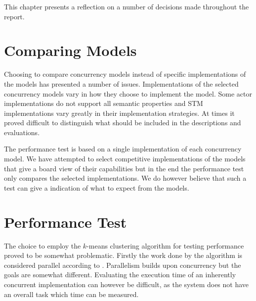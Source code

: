 \makeatletter {}\makeatother
{}
This chapter presents a reflection on a number of decisions made throughout the report.

\section{Comparing Models}
Choosing to compare concurrency models instead of specific implementations of the models has presented a number of issues. Implementations of the selected concurrency models vary in how they choose to implement the model. Some actor implementations do not support all semantic properties and \ac{STM} implementations vary greatly in their implementation strategies. At times it proved difficult to distinguish what should be included in the descriptions and evaluations. 

The performance test is based on a single implementation of each concurrency model. We have attempted to select competitive implementations of the models that give a board view of their capabilities but in the end the performance test only compares the selected implementations. We do however believe that such a test can give a indication of what to expect from the models.

\section{Performance Test}
The choice to employ the $k$-means clustering algorithm for testing performance proved to be somewhat problematic. Firstly the work done by the algorithm is considered parallel according to . Parallelism builds upon concurrency but the goals are somewhat different. Evaluating the execution time of an inherently concurrent implementation can however be difficult, as the system does not have an overall task which time can be measured.

